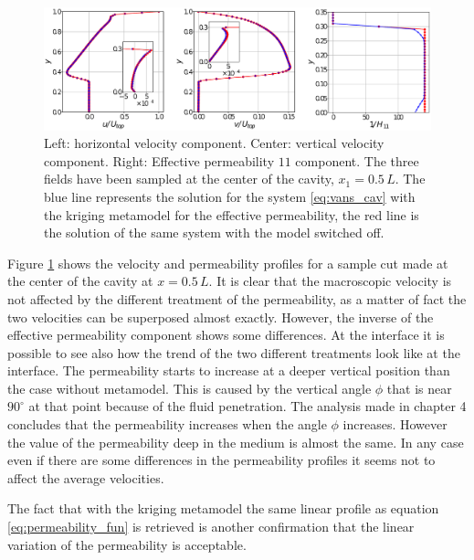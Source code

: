 \begin{figure}[h]
	\centering
	\includegraphics[width=0.9\linewidth]{chapter_5/figure/cav_5000}
	\caption{Left: horizontal velocity component. Center: vertical velocity component. Right: Effective permeability $11$ component. The three fields have been sampled at the center of the cavity, $x_1=0.5 \,L$. The blue line represents the solution for the system \eqref{eq:vans_cav} with the kriging metamodel for the effective permeability, the red line is the solution of the same system with the model switched off.}
	\label{fig:cav5000}
\end{figure}

Figure \ref{fig:cav5000} shows the velocity and permeability profiles for a sample cut made at the center of the cavity at $x=0.5\,L$.
It is clear that the macroscopic velocity is not affected by the different treatment of the permeability, as a matter of fact the two velocities can be superposed almost exactly.
However, the inverse of the effective permeability component shows some differences. At the interface it is possible to see also how the trend of the two different treatments look like at the interface. The permeability starts to increase at a deeper vertical position than the case without metamodel. This is caused by the vertical angle $\phi$ that is near $90^\circ$ at that point because of the fluid penetration. The analysis made in chapter 4 concludes that the permeability increases when the angle $\phi$ increases.
However the value of the permeability deep in the medium is almost the same. 
In any case even if there are some differences in the permeability profiles it seems not to affect the average velocities.

The fact that with the kriging metamodel the same linear profile as equation \ref{eq:permeability_fun} is retrieved is another confirmation that the linear variation of the permeability is acceptable.



